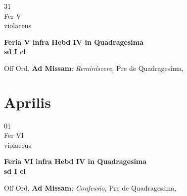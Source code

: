 \documentclass[10pt, openany]{book}
\begin{document}
        \begin{center}
            \begin{minipage}{3.5in}
                \vspace{2em}
                \begin{minipage}{0.5in}
                    {\Huge 31} \\
                    {\normalsize Fer V} \\
                    {\normalsize violaceus}
                \end{minipage}
                \begin{minipage}{3.0in}
                    \textbf{ \large Feria V infra Hebd IV in Quadragesima  \\
                    \textnormal{\normalsize sd I cl}} \\ 
                \end{minipage}
                \begin{justify}Off Ord, \textbf{Ad Missam}: \textit{Reminíscere,} Pre de Quadragesima,   
                \end{justify}
            \end{minipage}
        \end{center}
    
        \chapter{Aprilis}
                        
        \begin{center}
            \begin{minipage}{3.5in}
                \vspace{2em}
                \begin{minipage}{0.5in}
                    {\Huge 01} \\
                    {\normalsize Fer VI} \\
                    {\normalsize violaceus}
                \end{minipage}
                \begin{minipage}{3.0in}
                    \textbf{ \large Feria VI infra Hebd IV in Quadragesima  \\
                    \textnormal{\normalsize sd I cl}} \\ 
                \end{minipage}
                \begin{justify}Off Ord, \textbf{Ad Missam}: \textit{Confessio,} Pre de Quadragesima,   
                \end{justify}
            \end{minipage}
        \end{center}
    
\end{document}
